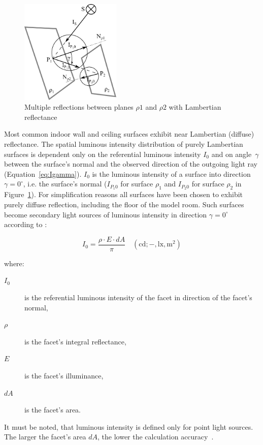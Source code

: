 \begin{figure}[htb]
  \centering
  \includegraphics[width=136pt]{diffuseReflection}
  \caption{Multiple reflections between planes $\rho1$ and $\rho2$ with Lambertian reflectance}
  \label{fig:difRefl}
\end{figure}

Most common indoor wall and ceiling surfaces exhibit near Lambertian (diffuse) reflectance. The spatial luminous intensity distribution of purely Lambertian surfaces is dependent only on the referential luminous intensity $I_{0}$ and on angle~$\gamma$ between the surface's normal and the observed direction of the outgoing light ray (Equation~\ref{eq:Igamma}). $I_{0}$ is the luminous intensity of a surface into direction $\gamma=0^{\circ}$, i.e. the surface's normal ($I_{P_{1}0}$ for surface $\rho_1$ and $I_{P_{2}0}$ for surface $\rho_2$ in Figure~\ref{fig:difRefl}). For simplification reasons all surfaces have been chosen to exhibit purely diffuse reflection, including the floor of the model room. Such surfaces become secondary light sources of luminous intensity in direction $\gamma=0^{\circ}$ according to \cite{Habel}:

\begin{equation}
I_{0}=\frac{\rho \cdot E \cdot dA}{\pi} \quad \mathrm{(cd;-,lx,m^{2})}
\label{eq:lumInt}
\end{equation}

where:
\begin{description}
	\item[$I_{0}$] is the referential luminous intensity of the facet in direction of the facet's normal,
	\item[$\rho$] is the facet's integral reflectance,
	\item[$E$] is the facet's illuminance,
	\item[$dA$] is the facet's area.
\end{description}

It must be noted, that luminous intensity is defined only for point light sources. The larger the facet's area $dA$, the lower the calculation accuracy~\cite{handbook}.

